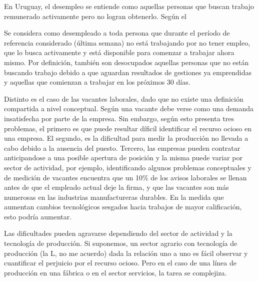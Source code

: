 En Uruguay, el desempleo se entiende como aquellas personas que buscan trabajo remunerado activamente pero no logran obtenerlo. Según el \cite{INE2019} 
\begin{center}
	\begin{minipage}{0.95\linewidth}
		\vspace{1pt}
		{\small
Se considera como desempleado a toda persona que durante el período de referencia considerado (última semana) no está trabajando por no tener empleo, que lo busca activamente y está disponible para comenzar a trabajar ahora mismo. Por definición, también son desocupados aquellas personas que no están buscando trabajo debido a que aguardan resultados de gestiones ya emprendidas y aquellas que comienzan a trabajar en los próximos 30 días.}
		\vspace{1pt}
	\end{minipage}
\end{center}
 


Distinto es el caso de las vacantes laborales, dado que no existe una definición compartida a nivel conceptual. Según \cite{Abraham1983} una vacante debe verse como una demanda insatisfecha por parte de la empresa. Sin embargo, según \cite{Elsby2015} esto presenta tres problemas, el primero es que puede resultar díficil identificar el recurso ocioso en una empresa. El segundo, es la dificultad para medir la producción no llevada a cabo debido a la ausencia del puesto. Tercero, las empresas pueden contratar anticipandose a una posible apertura de posición y la misma puede variar por sector de actividad, por ejemplo, \cite{Myers1966} identificando algunos problemas conceptuales y de medición de vacantes encuentra que un 10\% de los avisos laborales se llenan antes de que el empleado actual deje la firma, y que las vacantes son más numerosas en las industrias manufactureras durables. En la medida que aumentan cambios tecnológicos sesgados hacia trabajos de mayor calificación, esto podría aumentar.

Las dificultades pueden agravarse dependiendo del sector de actividad y la tecnología de producción. Si suponemos, un sector agrario con tecnología de producción (la L, no me acuerdo) dada la relación uno a uno es fácil observar y cuantificar el perjuicio por el recurso ocioso. Pero en el caso de una línea de producción en una fábrica o en el sector servicios, la tarea se complejiza.

